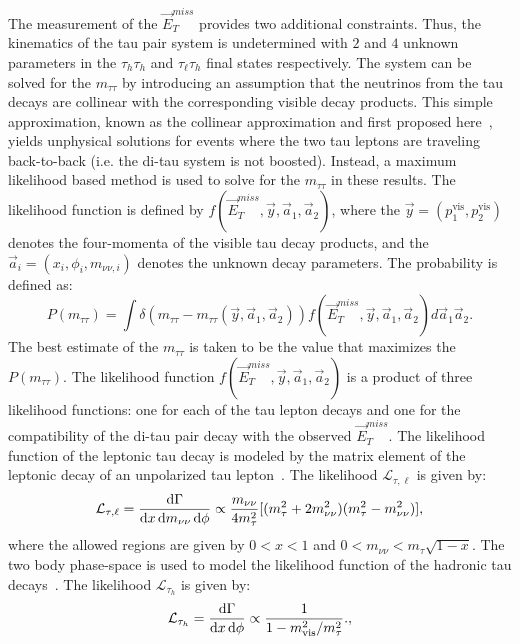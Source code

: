 The measurement of the $\vec{E}_{T}^{miss}$ provides two additional constraints. Thus, the kinematics of the tau pair system is undetermined with $2$ and $4$ unknown parameters in the $\tau_h\tau_h$ and $\tau_{\ell}\tau_h$ final states respectively.  The system can be solved for the $m_{\tau\tau}$ by introducing an assumption that the neutrinos from the tau decays are collinear with the corresponding visible decay products. This simple approximation, known as the collinear approximation and first proposed here~\cite{Ellis:1987xu}, yields unphysical solutions for events where the two tau leptons are traveling back-to-back (i.e. the di-tau system is not boosted). Instead, a maximum likelihood based method is used to solve for the $m_{\tau\tau}$ in these results. The likelihood function is defined by $f(\vec{E}_T^{miss},\vec{y},\vec{a}_1,\vec{a}_2)$, where the $\vec{y}=(p_1^{\mathrm{vis}},p_2^{\mathrm{vis}})$ denotes the four-momenta of the visible tau decay products, and the $\vec{a}_i=(x_i,\phi_i,m_{\nu\nu,i})$ denotes the unknown decay parameters. The probability is defined as:
\begin{equation} \label{eq:prob}
P(m_{\tau\tau}) = \int \delta(m_{\tau\tau}-m_{\tau\tau}(\vec{y},\vec{a}_1,\vec{a}_2)) f(\vec{E}_T^{miss}, \vec{y},\vec{a}_1,\vec{a}_2)d\vec{a}_1\vec{a}_2.
\end{equation}
The best estimate of the $m_{\tau\tau}$ is taken to be the value that maximizes the $P(m_{\tau\tau})$. The likelihood function $f(\vec{E}_T^{miss},\vec{y},\vec{a}_1,\vec{a}_2)$ is a product of three likelihood functions: one for each of the tau lepton decays and one for the compatibility of the di-tau pair decay with the observed $\vec{E}_T^{miss}$. The likelihood function of the leptonic tau decay is modeled by the matrix element of the leptonic decay of an unpolarized tau lepton~\cite{TauPol}. The likelihood $\mathcal{L}_{\tau,\ell}$ is given by:     
\begin{equation} 
\mathcal{L}_{\tau,\ell} = \frac{{\rm d}\Gamma}{{\rm d}x\,{\rm d}m_{\nu\nu}\,{\rm d}\phi} \propto \frac{m_{\nu\nu}}{4m_{\tau}^2} [(m_{\tau}^2 +2m_{\nu\nu}^2 )(m_{\tau}^2 - m_{\nu\nu}^2)],
\label{eq:likelihoodLepTauDecay}
\end{equation}
where the allowed regions are given by $0<x<1$ and $0<m_{\nu\nu}<m_{\tau}\sqrt{1-x}$. The two body phase-space is used to model the likelihood function of the hadronic tau decays~\cite{Agashe:2014kda}. The likelihood  $\mathcal{L}_{\tau_{h}}$ is given by:
\begin{equation}
\mathcal{L}_{\tau_{h}} = \frac{{\rm d}\Gamma}{{\rm d}x\,{\rm d}\phi} \propto \frac{1}{1- m^2_{\rm vis}/m^2_{\tau}}.,
\label{eq:likelihoodHadTauDecay}
\end{equation}
